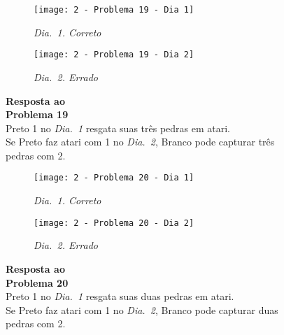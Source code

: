 \begin{SCfigure}[][h!]
    \begin{subfigure}[t]{.31\textwidth}
        \texttt{[image: 2 - Problema 19 - Dia 1]}
        \caption*{\emph{Dia.\@~1. Correto}}
    \end{subfigure}
    \hfill
    \begin{subfigure}[t]{.31\textwidth}
        \texttt{[image: 2 - Problema 19 - Dia 2]}
        \caption*{\emph{Dia.\@~2. Errado}}
    \end{subfigure}
    \hfill
    \caption*{\textbf{Resposta ao\\Problema 19}\\\vspace*{.25cm}Preto 1 no \emph{Dia.\@~1} resgata suas três pedras em atari.\\\vspace*{.25cm}Se Preto faz atari com 1 no \emph{Dia.\@~2}, Branco pode capturar três pedras com 2.}
\end{SCfigure}

\vfill

\begin{SCfigure}[][h!]
    \begin{subfigure}[t]{.31\textwidth}
        \texttt{[image: 2 - Problema 20 - Dia 1]}
        \caption*{\emph{Dia.\@~1. Correto}}
    \end{subfigure}
    \hfill
    \begin{subfigure}[t]{.31\textwidth}
        \texttt{[image: 2 - Problema 20 - Dia 2]}
        \caption*{\emph{Dia.\@~2. Errado}}
    \end{subfigure}
    \hfill
    \caption*{\textbf{Resposta ao\\Problema 20}\\\vspace*{.25cm}Preto 1 no \emph{Dia.\@~1} resgata suas duas pedras em atari.\\\vspace*{.25cm}Se Preto faz atari com 1 no \emph{Dia.\@~2}, Branco pode capturar duas pedras com 2.}
\end{SCfigure}

\vfill

